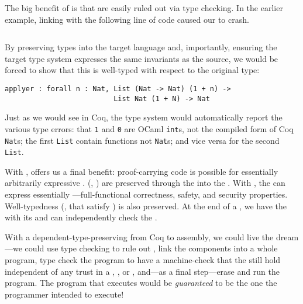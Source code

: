 The big benefit of  is that  are
easily ruled out via type checking.
In the earlier example, linking with the following line of code caused our
 to crash.
%
\inputminted[xleftmargin=1em]{ocaml}{chapters/intro/caller.ml}
%
\noindent By preserving types into the target language and, importantly, ensuring the
target type system expresses the same invariants as the source, we would be
forced to show that this is well-typed with respect to the original type:
\begin{verbatim}
applyer : forall n : Nat, List (Nat -> Nat) (1 + n) ->
                          List Nat (1 + N) -> Nat
\end{verbatim}
Just as we would see in Coq, the type system would automatically report the
various type errors: that \texttt{1} and \texttt{0}
are OCaml \texttt{int}s, not the compiled form of Coq
\texttt{Nat}s; the first \texttt{List} contain functions not
\texttt{Nat}s; and vice versa for the second \texttt{List}.

With ,  offers us a final
benefit: proof-carrying code is possible for essentially arbitrarily expressive
.
 (\ie, ) are preserved through the
 into the .
With , the  can express essentially
---full-functional correctness, safety, and security
properties.
Well-typedness (\ie,  that  satisfy
) is also preserved.
At the end of a  , we have the
 with its  and can independently check
the .

With a  dependent-type-preserving  from Coq to
 assembly, we could live the dream---we could use type
checking to rule out , link the components into a whole
program, type check the program to have a machine-check  that the
 still hold independent of any trust in a ,
, or , and---as a final step---erase
 and run the program.
%
The program that executes would be \emph{guaranteed} to be the
one the programmer intended to execute!


